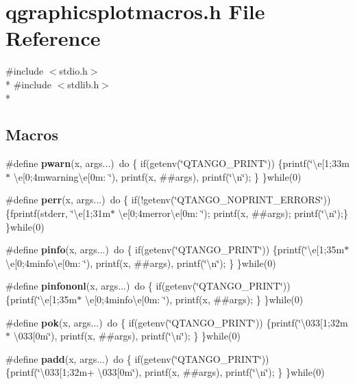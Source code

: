 \section{qgraphicsplotmacros.\+h File Reference}
\label{bk3_2qgraphicsplotmacros_8h}
{\ttfamily \#include $<$stdio.\+h$>$}\\*
{\ttfamily \#include $<$stdlib.\+h$>$}\\*
\subsection*{Macros}
\begin{DoxyCompactItemize}
\item 
\#define {\bf pwarn}(x,  args...)~do \{ if(getenv(\char`\"{}Q\+T\+A\+N\+G\+O\+\_\+\+P\+R\+I\+NT\char`\"{})) \{printf(\char`\"{}\textbackslash{}e[1;33m$\ast$ \textbackslash{}e[0;4mwarning\textbackslash{}e[0m\+: \char`\"{}), printf(x, \#\#args), printf(\char`\"{}\textbackslash{}n\char`\"{}); \} \}while(0)
\item 
\#define {\bf perr}(x,  args...)~do \{  if(!getenv(\char`\"{}Q\+T\+A\+N\+G\+O\+\_\+\+N\+O\+P\+R\+I\+N\+T\+\_\+\+E\+R\+R\+O\+RS\char`\"{})) \{fprintf(stderr, \char`\"{}\textbackslash{}e[1;31m$\ast$ \textbackslash{}e[0;4merror\textbackslash{}e[0m\+: \char`\"{}); printf(x, \#\#args); printf(\char`\"{}\textbackslash{}n\char`\"{});\} \}while(0)
\item 
\#define {\bf pinfo}(x,  args...)~do \{  if(getenv(\char`\"{}Q\+T\+A\+N\+G\+O\+\_\+\+P\+R\+I\+NT\char`\"{})) \{printf(\char`\"{}\textbackslash{}e[1;35m$\ast$ \textbackslash{}e[0;4minfo\textbackslash{}e[0m\+: \char`\"{}), printf(x, \#\#args), printf(\char`\"{}\textbackslash{}n\char`\"{}); \} \}while(0)
\item 
\#define {\bf pinfononl}(x,  args...)~do \{  if(getenv(\char`\"{}Q\+T\+A\+N\+G\+O\+\_\+\+P\+R\+I\+NT\char`\"{})) \{printf(\char`\"{}\textbackslash{}e[1;35m$\ast$ \textbackslash{}e[0;4minfo\textbackslash{}e[0m\+: \char`\"{}), printf(x, \#\#args); \} \}while(0)
\item 
\#define {\bf pok}(x,  args...)~do \{  if(getenv(\char`\"{}Q\+T\+A\+N\+G\+O\+\_\+\+P\+R\+I\+NT\char`\"{})) \{printf(\char`\"{}\textbackslash{}033[1;32m$\ast$ \textbackslash{}033[0m\char`\"{}), printf(x, \#\#args), printf(\char`\"{}\textbackslash{}n\char`\"{}); \} \}while(0)
\item 
\#define {\bf padd}(x,  args...)~do \{ if(getenv(\char`\"{}Q\+T\+A\+N\+G\+O\+\_\+\+P\+R\+I\+NT\char`\"{})) \{printf(\char`\"{}\textbackslash{}033[1;32m+ \textbackslash{}033[0m\char`\"{}), printf(x, \#\#args), printf(\char`\"{}\textbackslash{}n\char`\"{}); \} \}while(0)

\end{DoxyCompactItemize}
